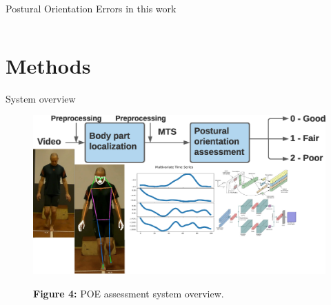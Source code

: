 \begin{frame}[fragile]{Postural Orientation Errors in this work}
\begin{columns}[T,onlytextwidth]
  \end{columns}

\end{frame}

\section{Methods}

\begin{frame}[fragile]{System overview}
    \begin{figure}
      \centering
      \includegraphics[width=\textwidth]{files/figs/presentation/sys-overview.eps}

      {\scriptsize\textbf{Figure 4:} POE assessment system overview.}
    \end{figure}
\end{frame}

